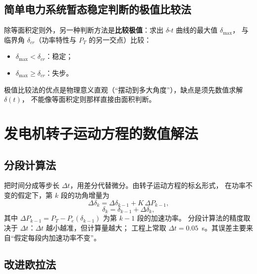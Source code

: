 \subsection{简单电力系统暂态稳定判断的极值比较法}

除等面积定则外，另一种判断方法是\textbf{比较极值}：求出 $\delta$-$t$ 曲线的最大值 $\delta_{\max}$，
与临界角 $\delta_{cr}$（功率特性与 $P_T$ 的另一交点）比较：
\begin{itemize}
  \item $\delta_{\max}<\delta_{cr}$：稳定；
  \item $\delta_{\max}\ge\delta_{cr}$：失步。
\end{itemize}
极值比较法的优点是物理意义直观（“摆动到多大角度”），缺点是须先数值求解 $\delta(t)$，
不能像等面积定则那样直接由面积判断。


\section{发电机转子运动方程的数值解法}

\subsection{分段计算法}

把时间分成等步长 $\Delta t$，用差分代替微分。由转子运动方程的标幺形式，
在功率不变的假定下，第 $k$ 段的功角增量为
\begin{equation}
  \Delta\delta_k=\Delta\delta_{k-1}+K\,\Delta P_{k-1},
\end{equation}
\begin{equation}
  \delta_k=\delta_{k-1}+\Delta\delta_k,
\end{equation}
其中
$\Delta P_{k-1}=P_T-P_e(\delta_{k-1})$ 为第 $k-1$ 段的加速功率。
分段计算法的精度取决于 $\Delta t$：$\Delta t$ 越小越准，但计算量越大；
工程上常取 $\Delta t=0.05$~s。其误差主要来自“假定每段内加速功率不变”。

\subsection{改进欧拉法}

